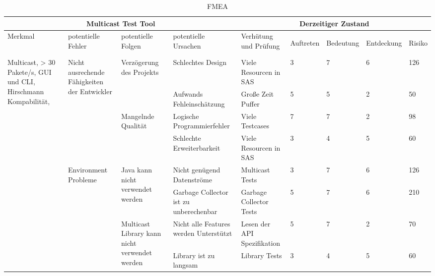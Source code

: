 \begin{table}
\caption{FMEA}
\begin{tabular}{|m{2cm}|m{2cm}|m{2cm}|m{2cm}|m{2cm}|m{0.3cm}|m{0.3cm}|m{0.3cm}|m{1cm}|}
\hline
\multicolumn{4}{|c|}{Multicast Test Tool} & 
\multicolumn{5}{c|}{Derzeitiger Zustand} \\
\hline
Merkmal & potentielle Fehler & potentielle Folgen & potentielle Ursachen & Verhütung und Prüfung &
\begin{sideways}Auftreten\end{sideways} & \begin{sideways}Bedeutung\end{sideways} & \begin{sideways}Entdeckung\end{sideways} & \begin{sideways}Risiko\end{sideways} \\
\hline
\multirow{8}{1.9cm}{Multicast, > 30 Pakete/s, GUI und CLI, Hirschmann Kompabilität, } &
\multirow{4}{1.9cm}{Nicht ausrechende Fähigkeiten der Entwickler} & 
\multirow{2}{1.9cm}{Verzögerung des Projekts} &
Schlechtes Design & Viele Resourcen in SAS & 3 & 7 & 6 & 126 \\
\cline{4-9}
& & & Aufwands Fehleinschätzung & Große Zeit Puffer & 5 & 5 & 2 & 50 \\
\cline{3-9}
& & \multirow{2}{1.9cm}{Mangelnde Qualität} &
Logische Programmierfehler & Viele Testcases & 7 & 7 & 2 & 98 \\ 
\cline{4-9}
& & & Schlechte Erweiterbarkeit & Viele Resourcen in SAS & 3 & 4 & 5 & 60 \\
\cline{2-9}

& \multirow{4}{1.9cm}{Environment Probleme} &
\multirow{2}{1.9cm}{Java kann nicht verwendet werden} &
Nicht genügend Datenströme & Multicast Tests & 3 & 7 & 6 & 126 \\
\cline{4-9}
& & & Garbage Collector ist zu unberechenbar & Garbage Collector Tests & 5 & 7 & 6 & 210 \\
\cline{3-9}
& & \multirow{2}{1.9cm}{Multicast Library kann nicht verwendet werden} &
Nicht alle Features werden Unterstützt & Lesen der API Spezifikation & 5 & 7 & 2 & 70 \\ 
\cline{4-9}
& & & Library ist zu langsam & Library Tests & 3 & 4 & 5 & 60 \\ 
\hline
\end{tabular}
\end{table}

